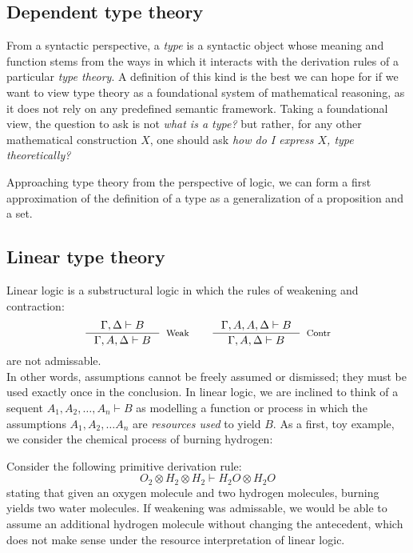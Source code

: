 \subsection{Dependent type theory}
From a syntactic perspective, a \textit{type} is a syntactic object whose meaning and function stems from the ways in which it interacts with the derivation rules of a particular \textit{type theory}. A definition of this kind is the best we can hope for if we want to view type theory as a foundational system of mathematical reasoning, as it does not rely on any predefined semantic framework. Taking a foundational view, the question to ask is not \textit{what is a type?} but rather, for any other mathematical construction $X$, one should ask \textit{how do I express $X$, type theoretically?}

Approaching type theory from the perspective of logic, we can form a first approximation of the definition of a type as a generalization of a proposition and a set.
\subsection{Linear type theory}
Linear logic is a substructural logic in which the rules of weakening and contraction:
\[
  \begin{split}
    \inference{\Gamma, \Delta \vdash B}{\Gamma, A, \Delta \vdash B}[Weak] \quad \quad 
    \inference{\Gamma, A, A, \Delta \vdash B}{\Gamma, A, \Delta \vdash B}[Contr]
    \end{split}
\]
are not admissable.\\
In other words, assumptions cannot be freely assumed or dismissed; they must be used exactly once in the conclusion. In linear logic, we are inclined to think of a sequent $A_1, A_2, \dots, A_n \vdash B$ as modelling a function or process in which the assumptions $A_1, A_2, \dots A_n$ are \textit{resources used} to yield $B$. As a first, toy example, we consider the chemical process of burning hydrogen:
\begin{expl}\label{burn}
Consider the following primitive derivation rule: 
\[
  O_2 \otimes H_2 \otimes H_2 \vdash H_2O \otimes H_2O
\]
stating that given an oxygen molecule and two hydrogen molecules, burning yields two water molecules. If weakening was admissable, we would be able to assume an additional hydrogen molecule without changing the antecedent, which does not make sense under the resource interpretation of linear logic.\\
\end{expl}

